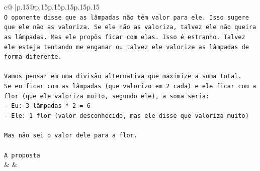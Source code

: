 \documentclass{article}
\begin{document}
{\begin{supertabular}{c@{$\;$}|p{.15\linewidth}@{}p{.15\linewidth}p{.15\linewidth}p{.15\linewidth}p{.15\linewidth}p{.15\linewidth}}
{{{\\ 
\texttt{O oponente disse que as lâmpadas não têm valor para ele. Isso sugere que ele não as valoriza. Se ele não as valoriza, talvez ele não queira as lâmpadas. Mas ele propôs ficar com elas. Isso é estranho. Talvez ele esteja tentando me enganar ou talvez ele valorize as lâmpadas de forma diferente.} \\
\\ 
\texttt{Vamos pensar em uma divisão alternativa que maximize a soma total.} \\
\texttt{Se eu ficar com as lâmpadas (que valorizo em 2 cada) e ele ficar com a flor (que ele valoriza muito, segundo ele), a soma seria:} \\
\texttt{{-} Eu: 3 lâmpadas * 2 = 6} \\
\texttt{{-} Ele: 1 flor (valor desconhecido, mas ele disse que valoriza muito)} \\
\\ 
\texttt{Mas não sei o valor dele para a flor.} \\
\\ 
\texttt{A proposta} \\
            }
        }
    }
    & & \\ \\


\end{supertabular}}
\end{document}
